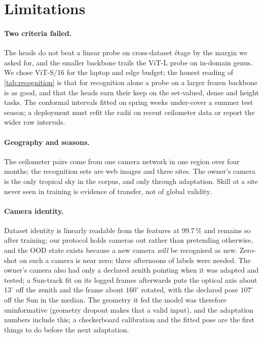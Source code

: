 \section{Limitations}
\label{sec:limitations}

\paragraph{Two criteria failed.} The heads do not beat a linear probe on cross-dataset \'etage by the margin we
asked for, and the smaller backbone trails the ViT-L probe on in-domain genus. We chose ViT-S/16 for the laptop and
edge budget; the honest reading of \cref{tab:recognition} is that for recognition alone a probe on a larger frozen
backbone is as good, and that the heads earn their keep on the set-valued, dense and height tasks. The conformal
intervals fitted on spring weeks under-cover a summer test season; a deployment must refit the radii on recent
ceilometer data or report the wider raw intervals.

\paragraph{Geography and seasons.} The ceilometer pairs come from one camera network in one region over four
months; the recognition sets are web images and three sites. The owner's camera is the only tropical sky in the
corpus, and only through adaptation. Skill at a site never seen in training is evidence of transfer, not of
global validity.

\paragraph{Camera identity.} Dataset identity is linearly readable from the features at 99.7\,\% and remains so
after training; our protocol holds cameras out rather than pretending otherwise, and the OOD state exists because a
new camera \emph{will} be recognised as new. Zero-shot on such a camera is near zero; three afternoons of labels
were needed. The owner's camera also had only a declared zenith pointing when it was adapted and tested; a
Sun-track fit on its logged frames afterwards puts the optical axis about $13^\circ$ off the zenith and the frame
about $160^\circ$ rotated, with the declared pose $107^\circ$ off the Sun in the median. The geometry it fed the
model was therefore uninformative (geometry dropout makes that a valid input), and the adaptation numbers include
this; a checkerboard calibration and the fitted pose are the first things to do before the next adaptation.


